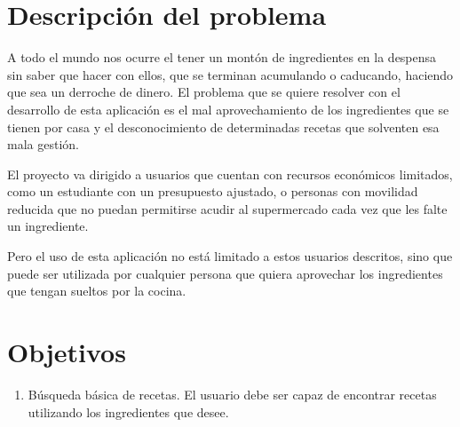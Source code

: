 \section{Descripción del problema}
A todo el mundo nos ocurre el tener un montón de ingredientes en la despensa sin saber que hacer con ellos, que se terminan acumulando o caducando, haciendo que sea un derroche de dinero. El problema que se quiere resolver con el desarrollo de esta aplicación es el mal aprovechamiento de los ingredientes que se tienen por casa y el desconocimiento de determinadas recetas que solventen esa mala gestión.

El proyecto va dirigido a usuarios que cuentan con recursos económicos limitados, como un estudiante con un presupuesto ajustado, o personas con movilidad reducida que no puedan permitirse acudir al supermercado cada vez que les falte un ingrediente. 

Pero el uso de esta aplicación no está limitado a estos usuarios descritos, sino que puede ser utilizada por cualquier persona que quiera aprovechar los ingredientes que tengan sueltos por la cocina.

\section{Objetivos}
\begin{enumerate} 
    \item Búsqueda básica de recetas. El usuario debe ser capaz de encontrar recetas utilizando los ingredientes que desee.
\end{enumerate}